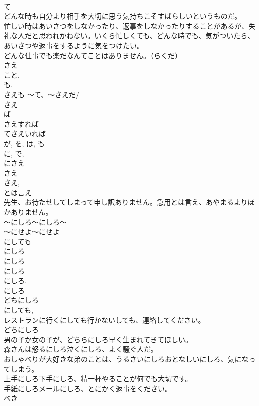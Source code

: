 \documentclass[8pt]{extreport}
\begin{document}
\begin{CJK}{UTF8}{min}
\\	て 
\\	どんな時も自分より相手を大切に思う気持ちこそすばらしいというものだ。 
\\	忙しい時はあいさつをしなかったり、返事をしなかったりすることがあるが、失礼な人だと思われかねない。いくら忙しくても、どんな時でも、気がついたら、あいさつや返事をするように気をつけたい。 
\\	どんな仕事でも楽だなんてことはありません。（らくだ） 
\\	さえ 
\\	こと. 
\\	も. 
\\	さえも ～て、～さえだ/
\\	さえ
\\	ば 
\\	さえすれば 
\\	てさえいれば 
\\	が, を, は, も 
\\	に, で, 
\\	にさえ 
\\	さえ 
\\	さえ, 
\\	とは言え 
\\	先生、お待たせしてしまって申し訳ありません。急用とは言え、あやまるよりほかありません。　
\\	～にしろ～にしろ～ 
\\	～にせよ～にせよ 
\\	にしても 
\\	にしろ
\\	にしろ 
\\	にしろ
\\	にしろ. 
\\	にしろ 
\\	どちにしろ 
\\	にしても, 
\\	レストランに行くにしても行かないしても、連絡してください。 
\\	どちにしろ 
\\	男の子か女の子が、どちらにしろ早く生まれてきてほしい。 
\\	森さんは怒るにしろ泣くにしろ、よく騒ぐ人だ。 
\\	おしゃべりが大好きな弟のことは、うるさいにしろおとなしいにしろ、気になってしまう。 
\\	上手にしろ下手にしろ、精一杯やることが何でも大切です。 
\\	手紙にしろメールにしろ、とにかく返事をください。 
\\	べき	

\end{CJK}
\end{document}
